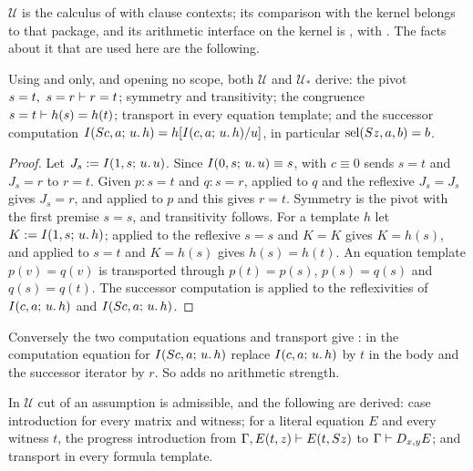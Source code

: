 $\mathcal U$ is the calculus of  with clause contexts;
its comparison with the kernel belongs to that package, and its arithmetic
interface on the kernel is , with . The
facts about it that are used here are the following.

\begin{lemma}
\label{disch:lem:step}
Using  and  only, and opening no scope, both
$\mathcal U$ and $\mathcal U_*$ derive: the pivot
$s=t,\ s=r\vdash r=t$; symmetry and transitivity; the congruence
$s=t\vdash h(s)=h(t)$; transport in every equation template; and the
successor computation
$I(S c,a;\,u.\,h)=h[I(c,a;\,u.\,h)/u]$, in particular
$\operatorname{sel}(S z,a,b)=b$.
\end{lemma}

\begin{proof}
Let $J_s\mathrel{:=}I(1,s;\,u.\,u)$. Since $I(0,s;\,u.\,u)\equiv s$,
 with $c\equiv 0$ sends $s=t$ and $J_s=r$ to $r=t$. Given
$p\colon s=t$ and $q\colon s=r$,  applied to $q$ and the
reflexive $J_s=J_s$ gives $J_s=r$, and  applied to $p$ and
this gives $r=t$. Symmetry is the pivot with the first premise $s=s$, and
transitivity follows. For a template $h$ let $K\mathrel{:=}I(1,s;\,u.\,h)$;
 applied to the reflexive $s=s$ and $K=K$ gives $K=h(s)$,
and  applied to $s=t$ and $K=h(s)$ gives $h(s)=h(t)$. An
equation template $p(v)=q(v)$ is transported through $p(t)=p(s)$,
$p(s)=q(s)$ and $q(s)=q(t)$. The successor computation is 
applied to the reflexivities of $I(c,a;\,u.\,h)$ and
$I(S c,a;\,u.\,h)$.
\end{proof}

Conversely the two computation equations and transport give
: in the computation equation for $I(S c,a;\,u.\,h)$
replace $I(c,a;\,u.\,h)$ by $t$ in the body and the successor iterator by
$r$. So  adds no arithmetic strength.

\begin{lemma}
\label{disch:lem:spec-unrestricted}
In $\mathcal U$ cut of an assumption is admissible, and the following are
derived: case introduction for every matrix and witness; for a literal
equation $E$ and every witness $t$, the progress introduction from
$\Gamma,E(t,z)\vdash E(t,S z)$ to $\Gamma\vdash D_{x,y}E$; and
transport in every formula template.
\end{lemma}

